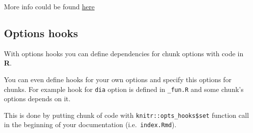 \documentclass[
  12pt,
  a4paper,
  12pt,
  oneside,
  openany]{book}
\newenvironment{Shaded}{\begin{snugshade}}{\end{snugshade}}
\newcommand{\CommentTok}[1]{\textcolor[rgb]{0.37,0.37,0.37}{\textit{#1}}}
\newcommand{\DataTypeTok}[1]{\textcolor[rgb]{0.27,0.27,0.27}{#1}}
\newcommand{\StringTok}[1]{\textcolor[rgb]{0.5,0.5,0.5}{#1}}
\begin{document}
\begin{Shaded}
\end{Shaded}

More info could be found \href{https://bookdown.org/yihui/rmarkdown-cookbook/opts-template.html}{here}

\hypertarget{usage-customize-optionsHooks}{%
\subsection{Options hooks}\label{usage-customize-optionsHooks}}

With options hooks you can define dependencies for chunk options with code in \textbf{R}.

You can even define hooks for your own options and specify this options for chunks. For example hook for \texttt{dia} option is defined in \texttt{\_fun.R} and some chunk's options depends on it.

This is done by putting chunk of code with \texttt{knitr::opts\_hooks\$set} function call in the beginning of your documentation (i.e.~\texttt{index.Rmd}).
\end{document}
